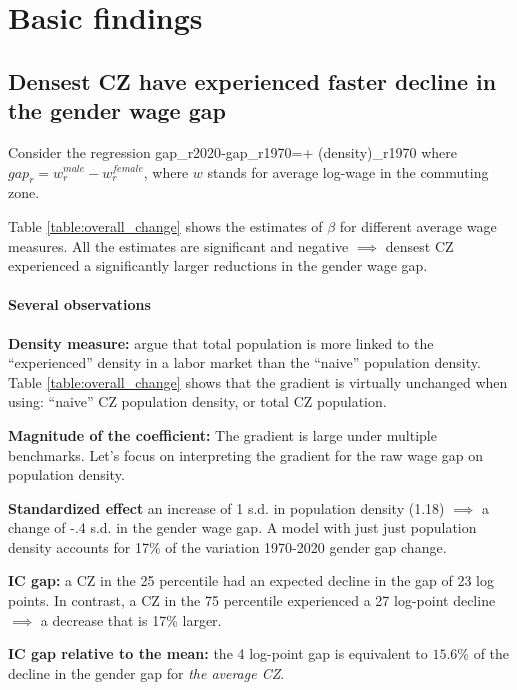 \section{Basic findings}
\subsection{Densest CZ have experienced faster decline in the gender wage gap}
Consider the regression
\beqns
	gap_{r2020}-gap_{r1970}=\alpha + \beta\ln(density)_{r1970}
\eeqns
where $gap_r=w_r^{male}-w_r^{female}$, where $w$ stands for average log-wage in the commuting zone.


Table \ref{table:overall_change} shows the estimates of $\beta$ for different average wage measures. All the estimates are significant and negative $\implies$ densest CZ experienced a significantly larger reductions in the gender wage gap. 

\paragraph{Several observations}


\bitem 
	\item \textbf{Density measure:} \cite{Duranton2020} argue that total population is more linked to the ``experienced'' density in a labor market than the ``naive'' population density. Table \ref{table:overall_change} shows that the gradient is virtually unchanged when using: ``naive'' CZ population density, or total CZ population.
	\item \textbf{Magnitude of the coefficient:} The gradient is large under multiple benchmarks. Let's focus on interpreting the gradient for the raw wage gap on population density.
	\bitem 
		\item \textbf{Standardized effect} an increase of 1 s.d. in population density (1.18) $\implies$ a change of -.4 s.d.  in the gender wage gap.  A model with just just population density accounts for 17\% of the variation 1970-2020 gender gap change.
		\item \textbf{IC gap:} a CZ in the 25 percentile had an expected decline in the gap of 23 log points. In contrast, a CZ in the 75 percentile experienced a 27 log-point decline $\implies$ a decrease that is 17\% larger.  
		\item \textbf{IC gap relative to the mean:} the 4 log-point gap is equivalent to $15.6\%$ of the decline in the gender gap for \textit{the average CZ}.
	\eitem 	
\eitem 


